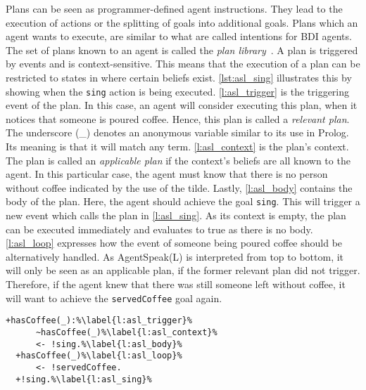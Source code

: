 Plans can be seen as programmer-defined agent instructions.
They lead to the execution of actions or the splitting of goals into additional goals.
Plans which an agent wants to execute, are similar to what are called intentions for BDI agents.
The set of plans known to an agent is called the \emph{plan library}~\cite{bordini_jason_2005}.
A plan is triggered by events and is context-sensitive.
This means that the execution of a plan can be restricted to states in where certain beliefs exist.
\autoref{lst:asl_sing} illustrates this by showing when the \texttt{sing} action is being executed.
\autoref{l:asl_trigger} is the triggering event of the plan.
In this case, an agent will consider executing this plan, when it notices that someone is poured coffee.
Hence, this plan is called a \emph{relevant plan}.
The underscore (\_) denotes an anonymous variable similar to its use in Prolog.
Its meaning is that it will match any term.
\autoref{l:asl_context} is the plan's context.
The plan is called an \emph{applicable plan} if the context's beliefs are all known to the agent.
In this particular case, the agent must know that there is no person without coffee indicated by the use of the tilde.
Lastly, \autoref{l:asl_body} contains the body of the plan.
Here, the agent should achieve the goal \texttt{sing}.
This will trigger a new event which calls the plan in \autoref{l:asl_sing}.
As its context is empty, the plan can be executed immediately and evaluates to true as there is no body.
\autoref{l:asl_loop} expresses how the event of someone being poured coffee should be alternatively handled.
As AgentSpeak(L) is interpreted from top to bottom, it will only be seen as an applicable plan, if the former relevant plan did not trigger.
Therefore, if the agent knew that there was still someone left without coffee, it will want to achieve the \texttt{servedCoffee} goal again.
\begin{lstlisting}[firstnumber=4, caption={Events for handling someone being poured a coffee as well as the \texttt{sing} plan.}, label=lst:asl_sing]
  +hasCoffee(_):%\label{l:asl_trigger}%
      ~hasCoffee(_)%\label{l:asl_context}%
      <- !sing.%\label{l:asl_body}%
  +hasCoffee(_)%\label{l:asl_loop}%
      <- !servedCoffee.
  +!sing.%\label{l:asl_sing}%
\end{lstlisting}

